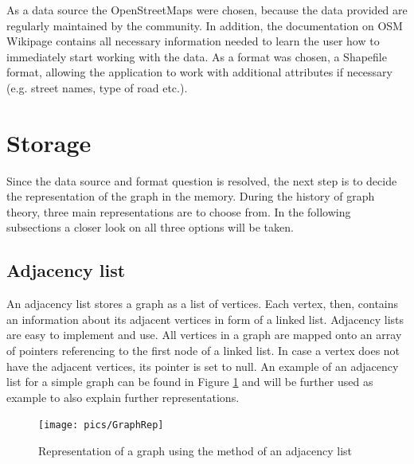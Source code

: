 \documentclass[thesis=M,english]{FITthesis}[2012/10/20]
\begin{document}
As a data source the OpenStreetMaps were chosen, because the data provided are regularly maintained by the community. In addition, the documentation on OSM Wikipage contains all necessary information needed to learn the user how to immediately start working with the data. As a format was chosen, a Shapefile format, allowing the application to work with additional attributes if necessary (e.g. street names, type of road etc.).

\section{Storage}
\label{sec:storage}
Since the data source and format question is resolved, the next step is to decide the representation of the graph in the memory. During the history of graph theory, three main representations are to choose from. In the following subsections a closer look on all three options will be taken.

\subsection{Adjacency list}
An adjacency list stores a graph as a list of vertices. Each vertex, then, contains an information about its adjacent vertices in form of a linked list. 
Adjacency lists are easy to implement and use. 
All vertices in a graph are mapped onto an array of pointers referencing to the first node of a linked list. In case a vertex does not have the adjacent vertices, its pointer is set to null. 
An example of an adjacency list for a simple graph can be found in Figure \ref{pic:AdjacencyList} and will be further used as example to also explain further representations. 

\begin{figure}[h]
\centering
\texttt{[image: pics/GraphRep]}
\caption{Representation of a graph using the method of an adjacency list}
\label{pic:AdjacencyList}
\end{figure}
\end{document}
